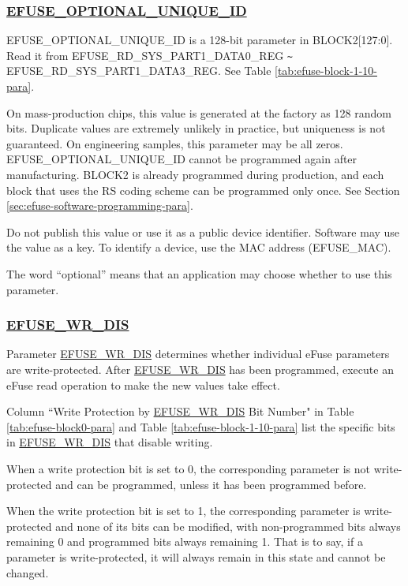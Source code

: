 \documentclass[main\_\_EN.tex]{subfiles}
\begin{document}
\subsubsection{\texorpdfstring{\hyperref[fielddesc:EFUSEOPTIONALUNIQUEID]{EFUSE\_OPTIONAL\_UNIQUE\_ID}}{EFUSE\_OPTIONAL\_UNIQUE\_ID}}
\label{sec:efuse-optional-unique-id}

EFUSE\_OPTIONAL\_UNIQUE\_ID is a 128-bit parameter in BLOCK2[127:0]. Read it from EFUSE\_RD\_SYS\_PART1\_DATA0\_REG \verb+~+ EFUSE\_RD\_SYS\_PART1\_DATA3\_REG. See Table \ref{tab:efuse-block-1-10-para}.

On mass-production chips, this value is generated at the factory as 128 random bits. Duplicate values are extremely unlikely in practice, but uniqueness is not guaranteed. On engineering samples, this parameter may be all zeros. EFUSE\_OPTIONAL\_UNIQUE\_ID cannot be programmed again after manufacturing. BLOCK2 is already programmed during production, and each block that uses the RS coding scheme can be programmed only once. See Section \ref{sec:efuse-software-programming-para}.

Do not publish this value or use it as a public device identifier. Software may use the value as a key. To identify a device, use the MAC address (EFUSE\_MAC).

The word ``optional'' means that an application may choose whether to use this parameter.

\subsubsection{\hyperref[fielddesc:EFUSEWRDIS]{EFUSE\_WR\_DIS}}
\label{sec:efuse-wr-dis}

Parameter \hyperref[fielddesc:EFUSEWRDIS]{EFUSE\_WR\_DIS} determines whether individual eFuse parameters are write-protected. After \hyperref[fielddesc:EFUSEWRDIS]{EFUSE\_WR\_DIS} has been programmed, execute an eFuse read operation to make the new values take effect.

Column ``Write Protection by \hyperref[fielddesc:EFUSEWRDIS]{EFUSE\_WR\_DIS} Bit Number" in Table  \ref{tab:efuse-block0-para} and Table \ref{tab:efuse-block-1-10-para} list the specific bits in \hyperref[fielddesc:EFUSEWRDIS]{EFUSE\_WR\_DIS} that disable writing.

When a write protection bit is set to 0, the corresponding parameter is not write-protected and can be programmed, unless it has been programmed before.

When the write protection bit is set to 1, the corresponding parameter is write-protected and none of its bits can be modified, with non-programmed bits always remaining 0 and programmed bits always remaining 1. That is to say, if a parameter is write-protected, it will always remain in this state and cannot be changed.
\end{document}
